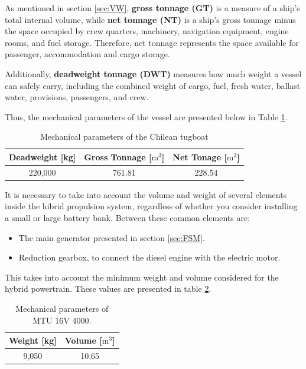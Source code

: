 As mentioned in section \ref{sec:VW}, \textbf{gross tonnage (GT)} is a measure of a ship's total internal volume, while \textbf{net tonnage (NT)} is a ship's gross tonnage minus the space occupied by crew quarters, machinery, navigation equipment, engine rooms, and fuel storage. Therefore, net tonnage represents the space available for passenger, accommodation and cargo storage.

Additionally, \textbf{deadweight tonnage (DWT)} measures how much weight a vessel can safely carry, including the combined weight of cargo, fuel, fresh water, ballast water, provisions, passengers, and crew. 

Thus, the mechanical parameters of the vessel are presented below in Table \ref{tab:mech_tug}.

\begin{table}[H]
	\centering
	\caption{Mechanical parameters of the Chilean tugboat}
	\label{tab:mech_tug}
	\begin{tabular}{|c|c|c|}
		\hline
		\rule{0pt}{8pt} \textbf{Deadweight [kg]} & \textbf{Gross Tonnage [${\text{m}}^{3}$]} & \textbf{Net Tonage [${\text{m}}^{3}$]} \\\hline
		\rule{0pt}{8pt} 220,000 & 761.81 & 228.54  \\\hline
	\end{tabular}
\end{table}

It is necessary to take into account the volume and weight of several elements inside the hibrid propulsion system, regardless of whether you consider installing a small or large battery bank. Between these common elements are:
\begin{itemize}
\item The main generator presented in section \ref{sec:FSM}.
\item Reduction gearbox, to connect the diesel engine with the electric motor.
\end{itemize}
This takes into account the minimum weight and volume considered for the hybrid powertrain. These values are presented in table \ref{tab:VW_MTU_16V_4000}.

\begin{table}[H]
	\centering
	\caption{Mechanical parameters of MTU 16V 4000.}
	\label{tab:VW_MTU_16V_4000}
	\begin{tabular}{|c|c|}
		\hline
		\rule{0pt}{8pt} \textbf{Weight [kg]} & \textbf{Volume [${\text{m}}^{3}$]} \\
		\hline
		\rule{0pt}{8pt} 9,050 & 10.65 \\
		\hline
	\end{tabular}
\end{table}


